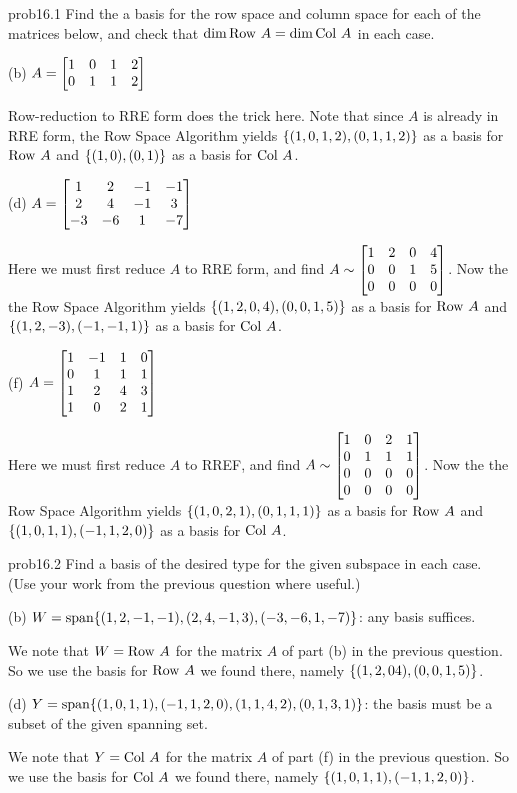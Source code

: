 
\begin{sol}{prob16.1} Find the a basis for the row space and column space for each of the matrices below, and check that $\dim \operatorname{Row\,} A= \dim \operatorname{Col\,} A $ in each case.
\medskip

(b) 
$A=\bmatrix 1&0&1&2\cr 0&1&1&2\endbmatrix $ 

\soln Row-reduction to RRE form does the trick here. Note that since $A$ is already in RRE form, the Row Space Algorithm yields $\{(1,0,1,2),(0,1,1,2) \}$ as a basis for $\operatorname{Row\,} A$ and $ \{(1,0),(0,1) \}$ as a basis for $\operatorname{Col\,} A$. 
\medskip 

(d) $A=\bmatrix 1&2&-1&-1\\2&4&-1&3\\ -3&-6&1&-7\endbmatrix$

\soln Here we must first reduce $A$ to RRE form, and find $A\sim \bmatrix 1 & 2 & 0 & 4 \\
 0 & 0 & 1 & 5 \\
 0 & 0 & 0 & 0 \endbmatrix$. Now the the Row Space Algorithm yields $\{(1,2,0,4),(0,0,1,5) \}$ as a basis for $\operatorname{Row\,} A$ and $ \{(1,2,-3),(-1,-1,1) \}$ as a basis for $\operatorname{Col\,} A$.  
\medskip

(f) $A=\bmatrix 1 & -1 & 1 & 0 \\
 0 & 1 & 1 & 1 \\
 1 & 2 & 4 & 3 \\
 1 & 0 & 2 & 1\endbmatrix$

\soln Here we must first reduce $A$ to RREF, and find $A\sim \bmatrix 1 & 0 & 2 & 1 \\
 0 & 1 & 1 & 1 \\
 0 & 0 & 0 & 0 \\
 0 & 0 & 0 & 0  \endbmatrix$. Now the the Row Space Algorithm yields $\{(1,0,2,1),(0,1,1,1) \}$ as a basis for $\operatorname{Row\,} A$ and $ \{(1,0,1,1),(-1,1,2,0) \}$ as a basis for $\operatorname{Col\,} A$.\medskip


\end{sol}

\begin{sol}{prob16.2}  Find a basis of the desired type for the given subspace in each case. (Use your work from the previous question where useful.)
\medskip

(b) $W=\textrm{span}\{(1,2,-1,-1),(2,4,-1,3),(-3,-6,1,-7)\}$: any basis suffices.

\soln We note that $W= \operatorname{Row\,} A$ for the matrix $A$ of part (b) in the previous question. So we use the basis for $\operatorname{Row\,} A$ we found there, namely $\{(1,2,04),(0,0,1,5) \}$.
\medskip

(d) $Y=\textrm{span}\{(1,0,1,1), (-1,1,2,0), (1,1,4,2), (0,1,3,1)\}$: the basis must be a subset of the given spanning set.

\soln We note that $Y= \operatorname{Col\,} A$ for the matrix $A$ of part (f) in the previous question. So we use the basis for $\operatorname{Col\,} A$ we found there, namely $ \{(1,0,1,1),(-1,1,2,0) \}$.



\medskip 
\end{sol}

